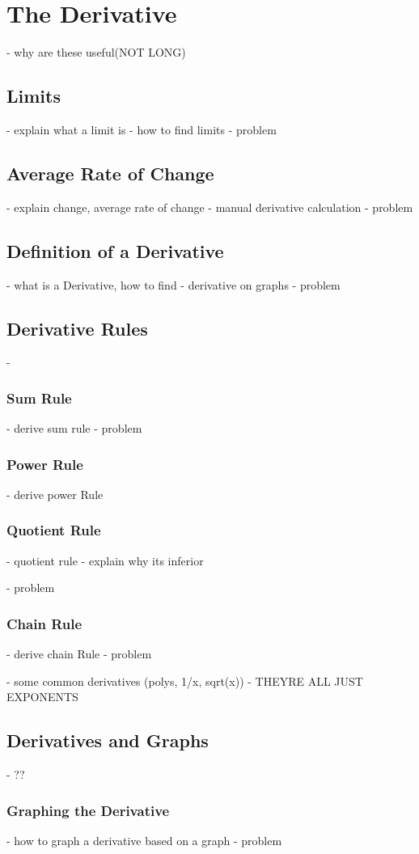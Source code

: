 \chapter{The Derivative}
- why are these useful(NOT LONG)
\section{Limits}
- explain what a limit is
- how to find limits 
- problem
\section{Average Rate of Change}
- explain change, average rate of change
- manual derivative calculation
- problem
\section{Definition of a Derivative}
- what is a Derivative, how to find
- derivative on graphs
- problem
\section{Derivative Rules}
- 
\subsection{Sum Rule}
- derive sum rule
- problem
\subsection{Power Rule}
- derive power Rule
\subsection{Quotient Rule}
- quotient rule
- explain why its inferior

- problem
\subsection{Chain Rule}
- derive chain Rule
- problem

- some common derivatives (polys, 1/x, sqrt(x))
- THEYRE ALL JUST EXPONENTS 
\section{Derivatives and Graphs}
- ??
\subsection{Graphing the Derivative}
- how to graph a derivative based on a graph
- problem
